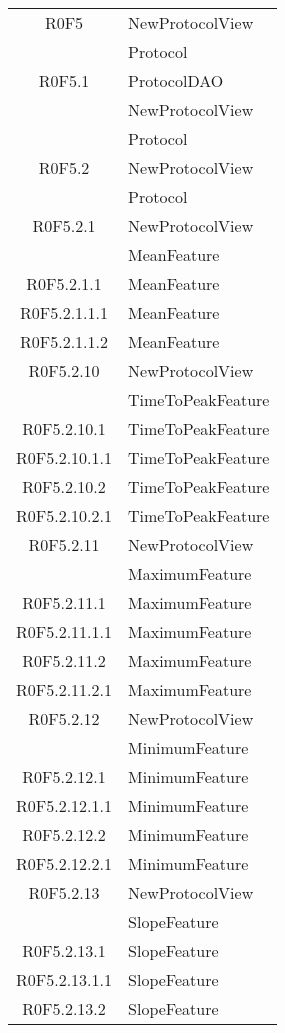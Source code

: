\begin{center}
\begin{longtable}{|c|l|}
\hline
R0F5 & NewProtocolView \\ 
 & Protocol \\ 
\hline
R0F5.1 & ProtocolDAO \\ 
 & NewProtocolView \\ 
 & Protocol \\ 
\hline
R0F5.2 & NewProtocolView \\ 
 & Protocol \\ 
\hline
R0F5.2.1 & NewProtocolView \\ 
 & MeanFeature \\ 
\hline
R0F5.2.1.1 & MeanFeature \\ 
\hline
R0F5.2.1.1.1 & MeanFeature \\ 
\hline
R0F5.2.1.1.2 & MeanFeature \\ 
\hline
R0F5.2.10 & NewProtocolView \\ 
 & TimeToPeakFeature \\ 
\hline
R0F5.2.10.1 & TimeToPeakFeature \\ 
\hline
R0F5.2.10.1.1 & TimeToPeakFeature \\ 
\hline
R0F5.2.10.2 & TimeToPeakFeature \\ 
\hline
R0F5.2.10.2.1 & TimeToPeakFeature \\ 
\hline
R0F5.2.11 & NewProtocolView \\ 
 & MaximumFeature \\ 
\hline
R0F5.2.11.1 & MaximumFeature \\ 
\hline
R0F5.2.11.1.1 & MaximumFeature \\ 
\hline
R0F5.2.11.2 & MaximumFeature \\ 
\hline
R0F5.2.11.2.1 & MaximumFeature \\ 
\hline
R0F5.2.12 & NewProtocolView \\ 
 & MinimumFeature \\ 
\hline
R0F5.2.12.1 & MinimumFeature \\ 
\hline
R0F5.2.12.1.1 & MinimumFeature \\ 
\hline
R0F5.2.12.2 & MinimumFeature \\ 
\hline
R0F5.2.12.2.1 & MinimumFeature \\ 
\hline
R0F5.2.13 & NewProtocolView \\ 
 & SlopeFeature \\ 
\hline
R0F5.2.13.1 & SlopeFeature \\ 
\hline
R0F5.2.13.1.1 & SlopeFeature \\ 
\hline
R0F5.2.13.2 & SlopeFeature \\ 

\end{longtable}
\end{center}

